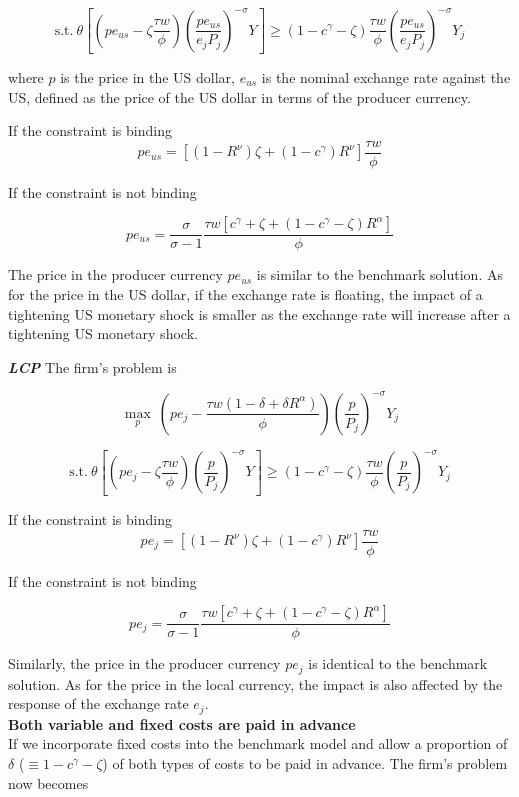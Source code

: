 $$
\text{s.t.} \ \theta [(pe_{us}-\zeta \frac{\tau w}{\phi}) (\frac{pe_{us}}{e_jP_j})^{-\sigma} Y]\geq(1-c^\gamma-\zeta)\frac{\tau w}{\phi} (\frac{pe_{us}}{e_jP_j})^{-\sigma} Y_j
$$

where $p$ is the price in the US dollar, $e_{us}$ is the nominal exchange rate against the US, defined as the price of the US dollar in terms of the producer currency.

If the constraint is binding
$$
pe_{us}=[(1-R^{\nu})\zeta+(1-c^\gamma)R^{\nu}] \frac{\tau w}{\phi}
$$

If the constraint is not binding

$$
pe_{us}=\frac{\sigma}{\sigma-1}\frac{\tau w [c^\gamma+\zeta+(1-c^\gamma-\zeta) R^\alpha]}{\phi}
$$

The price in the producer currency $pe_{us}$ is similar to the benchmark solution. As for the price in the US dollar, if the exchange rate is floating, the impact of a tightening US monetary shock is smaller as the exchange rate will increase after a tightening US monetary shock.


\textbf{\textit{LCP}} The firm's problem is 

$$
\max_{p} \ (pe_j- \frac{\tau w(1-\delta+\delta R^\alpha)}{\phi}) (\frac{p}{P_j})^{-\sigma} Y_j
$$

$$
\text{s.t.} \ \theta [(pe_j-\zeta \frac{\tau w}{\phi}) (\frac{p}{P_j})^{-\sigma} Y]\geq(1-c^\gamma-\zeta)\frac{\tau w}{\phi} (\frac{p}{P_j})^{-\sigma} Y_j
$$


If the constraint is binding
$$
pe_{j}=[(1-R^{\nu})\zeta+(1-c^\gamma)R^{\nu}] \frac{\tau w}{\phi}
$$

If the constraint is not binding

$$
pe_{j}=\frac{\sigma}{\sigma-1}\frac{\tau w [c^\gamma+\zeta+(1-c^\gamma-\zeta) R^\alpha]}{\phi}
$$

Similarly, the price in the producer currency $pe_{j}$ is identical to the benchmark solution. As for the price in the local currency, the impact is also affected by the response of the exchange rate $e_j$. \\



\textbf{Both variable and fixed costs are paid in advance} \\

If we incorporate fixed costs into the benchmark model and allow a proportion of $\delta$ ($\equiv 1-c^{\gamma}-\zeta$) of both types of costs to be paid in advance. The firm's problem now becomes

